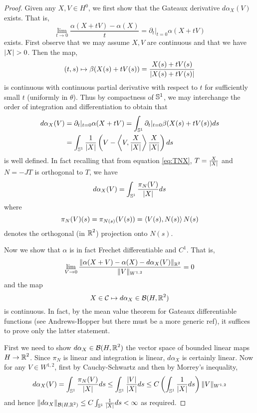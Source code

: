 \documentclass[12pt]{article}
\begin{document}
\begin{proof}
Given any \(X,V \in H^0\), we first show that the Gateaux derivative \(d\alpha_X (V)\) exists. That is,
\[
\lim_{t\to 0} \frac{\alpha(X + t V) - \alpha(X)}{t} = \partial_t|_{t=0} \alpha(X + tV)
\]
exists. First observe that we may assume \(X, V\) are continuous and that we have \(\left|{X}\right| > 0\). Then the map,
\[
(t, s) \mapsto \beta(X(s) + t V(s)) = \frac{X(s) + t V(s)}{\left|{X(s) + t V(s)}\right|}
\]
is continuous with continuous partial derivative with respect to \(t\) for sufficiently small \(t\) (uniformly in \(\theta\)). Thus by compactness of \(\operatorname{\mathbb{S}^1}\), we may interchange the order of integration and differentiation to obtain that
\[
\begin{split}
d\alpha_X (V) &= \partial_t|_{t=0} \alpha(X + tV) = \int_{\operatorname{\mathbb{S}^1}} \partial_t|_{t=0} \beta (X(s) + tV(s))  ds \\
&= \int_{\operatorname{\mathbb{S}^1}} \frac{1}{\left|{X}\right|}\left(V - \left\langle{V},{\frac{X}{\left|{X}\right|}}\right\rangle \frac{X}{\left|{X}\right|}\right) ds
\end{split}
\]
is well defined. In fact recalling that from equation \eqref{eq:TNX}, \(T = \tfrac{X}{\left|{X}\right|}\) and \(N = -J T\) is orthogonal to \(T\), we have
\begin{equation}
\label{eq:alphagateaux}
d\alpha_X (V) = \int_{\operatorname{\mathbb{S}^1}} \frac{\pi_N(V)}{\left|{X}\right|} ds
\end{equation}
where
\[
\pi_N (V) (s)= \pi_{N (s)} (V(s)) = \left\langle{V(s)},{N(s)}\right\rangle N(s)
\]
denotes the orthogonal (in \(\operatorname{\mathbb{R}}^2\)) projection onto \(N(s)\).

Now we show that \(\alpha\) is in fact Frechet differentiable and \(C^1\). That is,
\[
\lim_{V \to 0} \frac{\|\alpha(X + V) - \alpha(X) - d\alpha_X(V)\|_{\operatorname{\mathbb{R}}^2}}{\|V\|_{W^{1,2}}} = 0
\]
and the map
\[
X \in \operatorname{\mathcal{C}} \mapsto d\alpha_X \in \mathcal{B} (H, \operatorname{\mathbb{R}}^2)
\]
is continuous. In fact, by the mean value theorem for Gateaux differentiable functions (see Andrews-Hopper but there must be a more generic ref), it suffices to prove only the latter statement.

First we need to show \(d\alpha_X \in \mathcal{B} (H, \operatorname{\mathbb{R}}^2)\) the vector space of bounded linear maps \(H \to \operatorname{\mathbb{R}}^2\). Since \(\pi_N\) is linear and integration is linear, \(d\alpha_X\) is certainly linear. Now for any \(V \in W^{1,2}\), first by Cauchy-Schwartz and then by Morrey's inequality,
\[
d\alpha_X(V) = \int_{\operatorname{\mathbb{S}^1}} \frac{\pi_N(V)}{\left|{X}\right|} ds \leq \int_{\operatorname{\mathbb{S}^1}} \frac{\left|{V}\right|}{\left|{X}\right|} ds \leq C \left(\int_{\operatorname{\mathbb{S}^1}} \frac{1}{\left|{X}\right|} ds\right) \|V\|_{W^{1,2}}
\]
and hence \(\|d\alpha_X\|_{\mathcal{B}(H, \operatorname{\mathbb{R}}^2)} \leq C \int_{\operatorname{\mathbb{S}^1}} \frac{1}{\left|{X}\right|} ds < \infty\) as required.


\end{proof}
\end{document}
